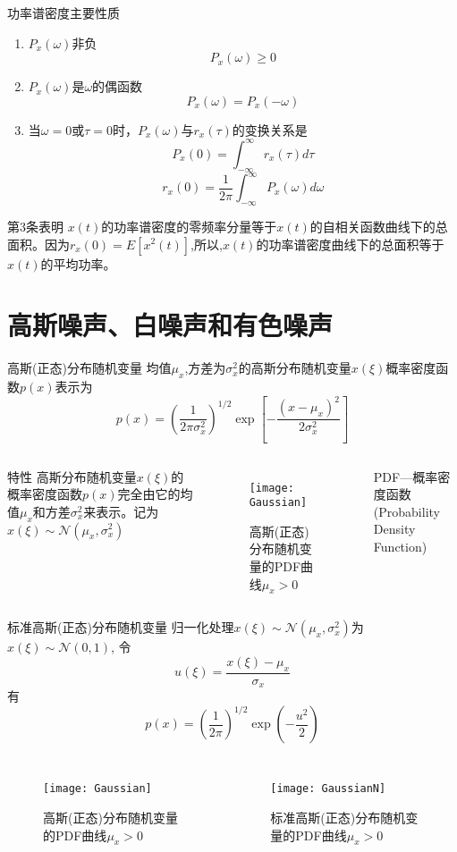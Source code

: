 \begin{frame}{功率谱密度主要性质}
\begin{enumerate}
	\item $P_x(\omega)$非负
			$$P_x(\omega)\ge 0$$
	\item $P_x(\omega)$是$\omega$的偶函数
			$$P_x(\omega) = P_x(-\omega)$$
	\item 当$\omega=0$或$\tau=0$时，$P_x(\omega)$与$r_x(\tau)$的变换关系是
			$$P_x(0)=\int_{-\infty}^{\infty}r_x(\tau)d\tau$$
			$$r_x(0)=\frac{1}{2\pi}\int_{-\infty}^{\infty}P_x(\omega)d\omega$$	
\end{enumerate}
\begin{block}{第3条表明}
	$x(t)$的功率谱密度的零频率分量等于$x(t)$的自相关函数曲线下的总面积。因为$r_x(0)=E[x^2(t)]$,所以,$x(t)$的功率谱密度曲线下的总面积等于$x(t)$的平均功率。
\end{block}
\end{frame}

\section{高斯噪声、白噪声和有色噪声}

\begin{frame}{高斯(正态)分布随机变量}
均值$\mu_x$,方差为$\sigma_x^2$的高斯分布随机变量$x(\xi)$概率密度函数$p(x)$表示为
\[p(x)=\left(\frac{1}{2\pi\sigma_x^2}\right)^{1/2}\exp\left[-\frac{(x-\mu_x)^2}{2\sigma_x^2}\right] \]
\begin{columns}
	\begin{block}{特性}
		高斯分布随机变量$x(\xi)$的概率密度函数$p(x)$完全由它的均值$\mu_x$和方差$\sigma_x^2$来表示。记为$x(\xi)\sim\mathcal{N}(\mu_x,\sigma_x^2)$
	\end{block}
	\begin{figure}[!h]
		\centering
		\texttt{[image: Gaussian]}\\
		\caption{高斯(正态)分布随机变量的PDF曲线$\mu_x>0$}
	\end{figure}
    \tiny PDF---概率密度函数(Probability Density Function)
\end{columns}
\end{frame}

\begin{frame}{标准高斯(正态)分布随机变量}
归一化处理$x(\xi)\sim\mathcal{N}(\mu_x,\sigma_x^2)$为$x(\xi)\sim\mathcal{N}(0,1)$, 令
\[u(\xi)=\frac{x(\xi)-\mu_x}{\sigma_x}\]
有
\[p(x)=\left(\frac{1}{2\pi}\right)^{1/2}\exp\left(-\frac{u^2}{2}\right) \]
\begin{columns}
\begin{figure}[!h]
	\centering
	\texttt{[image: Gaussian]}\\
	\caption{高斯(正态)分布随机变量的PDF曲线$\mu_x>0$}
\end{figure}
\begin{figure}[!h]
	\centering
	\texttt{[image: GaussianN]}\\
	\caption{标准高斯(正态)分布随机变量的PDF曲线$\mu_x>0$}
\end{figure}
\end{columns}
\end{frame}

